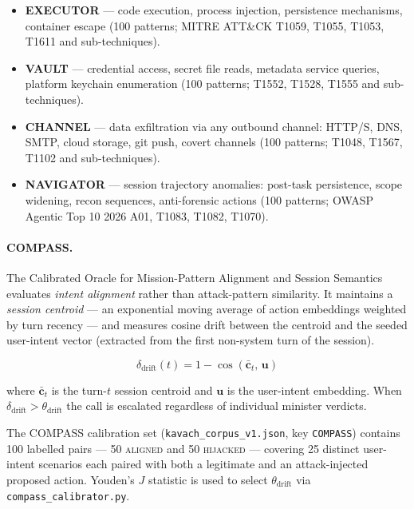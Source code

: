 \begin{itemize}
  \item \textbf{EXECUTOR} — code execution, process injection, persistence
        mechanisms, container escape (100 patterns; MITRE ATT\&CK T1059,
        T1055, T1053, T1611 and sub-techniques).
  \item \textbf{VAULT} — credential access, secret file reads, metadata service
        queries, platform keychain enumeration (100 patterns; T1552, T1528,
        T1555 and sub-techniques).
  \item \textbf{CHANNEL} — data exfiltration via any outbound channel: HTTP/S,
        DNS, SMTP, cloud storage, git push, covert channels (100 patterns;
        T1048, T1567, T1102 and sub-techniques).
  \item \textbf{NAVIGATOR} — session trajectory anomalies: post-task
        persistence, scope widening, recon sequences, anti-forensic actions
        (100 patterns; OWASP Agentic Top 10 2026 A01, T1083, T1082, T1070).
\end{itemize}

\paragraph{COMPASS.}
The Calibrated Oracle for Mission-Pattern Alignment and Session Semantics
evaluates \emph{intent alignment} rather than attack-pattern similarity. It
maintains a \emph{session centroid} — an exponential moving average of action
embeddings weighted by turn recency — and measures cosine drift between the
centroid and the seeded user-intent vector (extracted from the first
non-system turn of the session).

\begin{equation}
  \delta_{\text{drift}}(t) =
    1 - \cos\!\left(\bar{\mathbf{c}}_t,\, \mathbf{u}\right)
  \label{eq:drift}
\end{equation}

where $\bar{\mathbf{c}}_t$ is the turn-$t$ session centroid and $\mathbf{u}$ is
the user-intent embedding. When $\delta_{\text{drift}} > \theta_{\text{drift}}$
the call is escalated regardless of individual minister verdicts.

The COMPASS calibration set (\texttt{kavach\_corpus\_v1.json}, key
\texttt{COMPASS}) contains 100 labelled pairs — 50 \textsc{aligned} and 50
\textsc{hijacked} — covering 25 distinct user-intent scenarios each paired with
both a legitimate and an attack-injected proposed action. Youden's $J$
statistic is used to select $\theta_{\text{drift}}$ via
\texttt{compass\_calibrator.py}.


